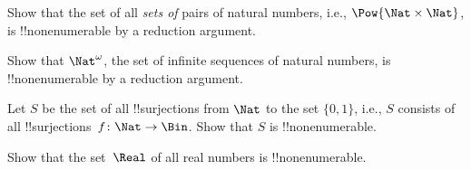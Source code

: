 \begin{prob}
Show that the set of all \emph{sets of} pairs of natural numbers,
i.e., $\Pow{\Nat \times \Nat}$, is !!{nonenumerable} by a reduction
argument.
\end{prob}

\begin{prob}
Show that $\Nat^\omega$, the set of infinite sequences of natural
numbers, is !!{nonenumerable} by a reduction argument.
\end{prob}








\begin{prob}
Let $S$ be the set of all !!{surjection}s from $\Nat$ to the set
$\{0,1\}$, i.e., $S$ consists of all !!{surjection}s~$f \colon \Nat
\to \Bin$.  Show that $S$ is !!{nonenumerable}.
\end{prob}

\begin{prob}
Show that the set~$\Real$ of all real numbers is !!{nonenumerable}.
\end{prob}



\OLEndChapterHook

